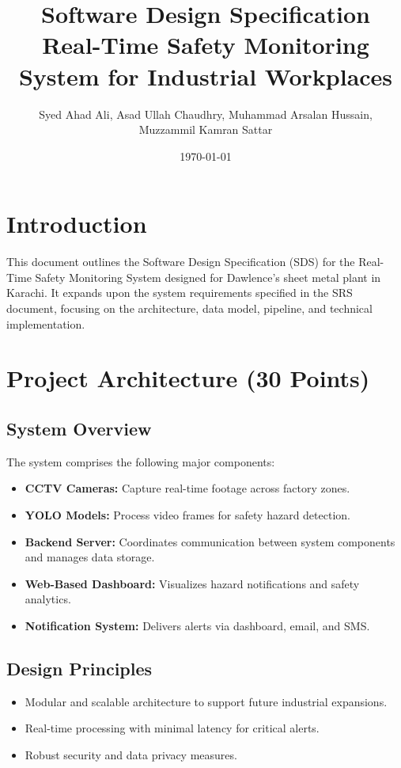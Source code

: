 \documentclass[12pt]{article}
\title{Software Design Specification \\ \large Real-Time Safety Monitoring System for Industrial Workplaces}
\author{Syed Ahad Ali, Asad Ullah Chaudhry, Muhammad Arsalan Hussain, \\ Muzzammil Kamran Sattar}
\date{\today}
\begin{document}
\maketitle
\tableofcontents
\newpage

\section{Introduction}
This document outlines the Software Design Specification (SDS) for the Real-Time Safety Monitoring System designed for Dawlence’s sheet metal plant in Karachi. It expands upon the system requirements specified in the SRS document, focusing on the architecture, data model, pipeline, and technical implementation.

\section{Project Architecture (30 Points)}
\subsection{System Overview}
The system comprises the following major components:
\begin{itemize}
    \item \textbf{CCTV Cameras:} Capture real-time footage across factory zones.
    \item \textbf{YOLO Models:} Process video frames for safety hazard detection.
    \item \textbf{Backend Server:} Coordinates communication between system components and manages data storage.
    \item \textbf{Web-Based Dashboard:} Visualizes hazard notifications and safety analytics.
    \item \textbf{Notification System:} Delivers alerts via dashboard, email, and SMS.
\end{itemize}


\subsection{Design Principles}
\begin{itemize}
    \item Modular and scalable architecture to support future industrial expansions.
    \item Real-time processing with minimal latency for critical alerts.
    \item Robust security and data privacy measures.
\end{itemize}
\end{document}
